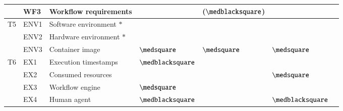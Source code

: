 \begin{table}[ht!]
\begin{tabularx}{\linewidth}{l l L l l l l}
    & WF3   & Workflow requirements             & ~ & ($\medblacksquare$) & ~    \\
\midrule
T5  & ENV1  & Software environment $\ast$       & ~ & ~  & ~ \\
    & ENV2  & Hardware environment $\ast$       & ~ & ~  & ~ \\
    & ENV3  & Container image                   & $\medsquare$ & $\medsquare$ & $\medsquare$\\
\midrule
T6  & EX1   & Execution timestamps              &  $\medblacksquare$ & ~ & ~ \\
    & EX2   & Consumed resources                &  ~ & ~ & $\medsquare$ \\
    & EX3   & Workflow engine                   &  $\medsquare$ & ~ & ~    \\
    & EX4   & Human agent                       & $\medblacksquare$ & ~ & $\medblacksquare$     \\
\bottomrule
\end{tabularx}


\end{table}
